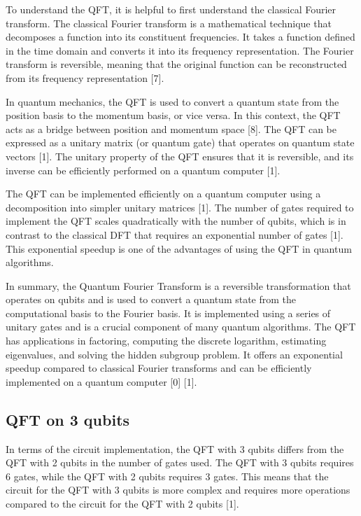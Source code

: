 \documentclass[pra,onecolumn,superscriptaddress]{revtex4}%
\begin{document}
To understand the QFT, it is helpful to first understand the classical Fourier transform. The classical Fourier transform is a mathematical technique that decomposes a function into its constituent frequencies. It takes a function defined in the time domain and converts it into its frequency representation. The Fourier transform is reversible, meaning that the original function can be reconstructed from its frequency representation [7].

In quantum mechanics, the QFT is used to convert a quantum state from the position basis to the momentum basis, or vice versa. In this context, the QFT acts as a bridge between position and momentum space [8]. The QFT can be expressed as a unitary matrix (or quantum gate) that operates on quantum state vectors [1]. The unitary property of the QFT ensures that it is reversible, and its inverse can be efficiently performed on a quantum computer [1].

The QFT can be implemented efficiently on a quantum computer using a decomposition into simpler unitary matrices [1]. The number of gates required to implement the QFT scales quadratically with the number of qubits, which is in contrast to the classical DFT that requires an exponential number of gates [1]. This exponential speedup is one of the advantages of using the QFT in quantum algorithms.

In summary, the Quantum Fourier Transform is a reversible transformation that operates on qubits and is used to convert a quantum state from the computational basis to the Fourier basis. It is implemented using a series of unitary gates and is a crucial component of many quantum algorithms. The QFT has applications in factoring, computing the discrete logarithm, estimating eigenvalues, and solving the hidden subgroup problem. It offers an exponential speedup compared to classical Fourier transforms and can be efficiently implemented on a quantum computer [0] [1].

\subsection{QFT on 3 qubits}

In terms of the circuit implementation, the QFT with 3 qubits differs from the QFT with 2 qubits in the number of gates used. The QFT with 3 qubits requires 6 gates, while the QFT with 2 qubits requires 3 gates. This means that the circuit for the QFT with 3 qubits is more complex and requires more operations compared to the circuit for the QFT with 2 qubits [1].
\end{document}
